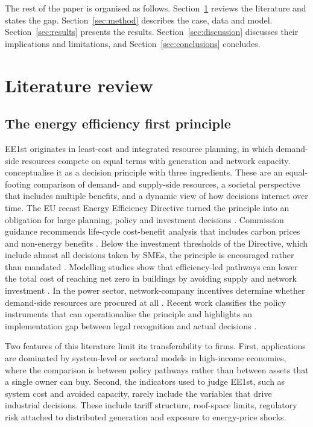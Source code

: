 \documentclass[preprint,12pt,authoryear]{elsarticle}
\begin{document}
The rest of the paper is organised as follows. Section~\ref{sec:lit} reviews the literature and states the gap. Section~\ref{sec:method} describes the case, data and model. Section~\ref{sec:results} presents the results. Section~\ref{sec:discussion} discusses their implications and limitations, and Section~\ref{sec:conclusions} concludes.

\section{Literature review}
\label{sec:lit}

\subsection{The energy efficiency first principle}
EE1st originates in least-cost and integrated resource planning, in which demand-side resources compete on equal terms with generation and network capacity. \citet{mandel2022} conceptualise it as a decision principle with three ingredients. These are an equal-footing comparison of demand- and supply-side resources, a societal perspective that includes multiple benefits, and a dynamic view of how decisions interact over time. The EU recast Energy Efficiency Directive turned the principle into an obligation for large planning, policy and investment decisions \citep{eu2023eed}. Commission guidance recommends life-cycle cost-benefit analysis that includes carbon prices and non-energy benefits \citep{ec2021ee1st,ec2024ee1st}. Below the investment thresholds of the Directive, which include almost all decisions taken by SMEs, the principle is encouraged rather than mandated \citep{ec2024ee1st}. Modelling studies show that efficiency-led pathways can lower the total cost of reaching net zero in buildings by avoiding supply and network investment \citep{mandel2023}. In the power sector, network-company incentives determine whether demand-side resources are procured at all \citep{pato2022}. Recent work classifies the policy instruments that can operationalise the principle and highlights an implementation gap between legal recognition and actual decisions \citep{mandel2024}.

Two features of this literature limit its transferability to firms. First, applications are dominated by system-level or sectoral models in high-income economies, where the comparison is between policy pathways rather than between assets that a single owner can buy. Second, the indicators used to judge EE1st, such as system cost and avoided capacity, rarely include the variables that drive industrial decisions. These include tariff structure, roof-space limits, regulatory risk attached to distributed generation and exposure to energy-price shocks.
\end{document}
